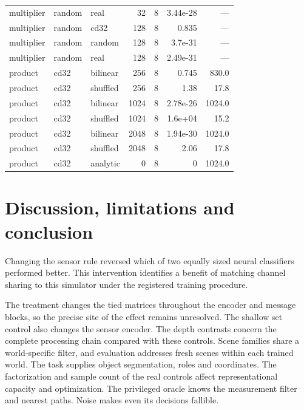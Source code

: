 \documentclass[10pt]{article}
\begin{document}
\begin{longtable}{lllrrrr}
multiplier & random & real & 32 & 8 & 3.44e-28 & ---\\
multiplier & random & cd32 & 128 & 8 & 0.835 & ---\\
multiplier & random & random & 128 & 8 & 3.7e-31 & ---\\
multiplier & random & real & 128 & 8 & 2.49e-31 & ---\\
product & cd32 & bilinear & 256 & 8 & 0.745 & 830.0\\
product & cd32 & shuffled & 256 & 8 & 1.38 & 17.8\\
product & cd32 & bilinear & 1024 & 8 & 2.78e-26 & 1024.0\\
product & cd32 & shuffled & 1024 & 8 & 1.6e+04 & 15.2\\
product & cd32 & bilinear & 2048 & 8 & 1.94e-30 & 1024.0\\
product & cd32 & shuffled & 2048 & 8 & 2.06 & 17.8\\
product & cd32 & analytic & 0 & 8 & 0 & 1024.0\\
\end{longtable}
\section{Discussion, limitations and conclusion}
Changing the sensor rule reversed which of two equally sized neural classifiers performed better. This intervention identifies a benefit of matching channel sharing to this simulator under the registered training procedure.

The treatment changes the tied matrices throughout the encoder and message blocks, so the precise site of the effect remains unresolved. The shallow set control also changes the sensor encoder. The depth contrasts concern the complete processing chain compared with these controls. Scene families share a world-specific filter, and evaluation addresses fresh scenes within each trained world. The task supplies object segmentation, roles and coordinates. The factorization and sample count of the real controls affect representational capacity and optimization. The privileged oracle knows the measurement filter and nearest paths. Noise makes even its decisions fallible.
\end{document}
